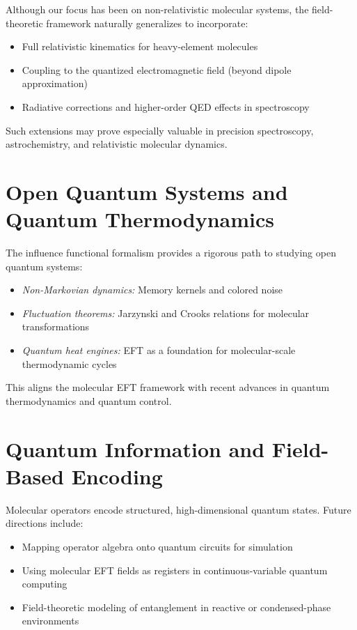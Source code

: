 Although our focus has been on non-relativistic molecular systems, the field-theoretic framework naturally generalizes to incorporate:
\begin{itemize}
  \item Full relativistic kinematics for heavy-element molecules
  \item Coupling to the quantized electromagnetic field (beyond dipole approximation)
  \item Radiative corrections and higher-order QED effects in spectroscopy
\end{itemize}

Such extensions may prove especially valuable in precision spectroscopy, astrochemistry, and relativistic molecular dynamics.

\section{Open Quantum Systems and Quantum Thermodynamics}

The influence functional formalism provides a rigorous path to studying open quantum systems:
\begin{itemize}
  \item \emph{Non-Markovian dynamics:} Memory kernels and colored noise
  \item \emph{Fluctuation theorems:} Jarzynski and Crooks relations for molecular transformations
  \item \emph{Quantum heat engines:} EFT as a foundation for molecular-scale thermodynamic cycles
\end{itemize}

This aligns the molecular EFT framework with recent advances in quantum thermodynamics and quantum control.

\section{Quantum Information and Field-Based Encoding}

Molecular operators encode structured, high-dimensional quantum states. Future directions include:
\begin{itemize}
  \item Mapping operator algebra onto quantum circuits for simulation
  \item Using molecular EFT fields as registers in continuous-variable quantum computing
  \item Field-theoretic modeling of entanglement in reactive or condensed-phase environments
\end{itemize}

